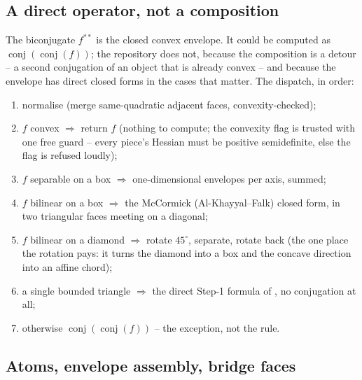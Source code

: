 \documentclass[11pt]{article}
\theoremstyle{definition}
\begin{document}
\subsection{A direct operator, not a composition}

The biconjugate $f^{**}$ is the closed convex envelope. It could be computed as
$\operatorname{conj}(\operatorname{conj}(f))$; the repository does not, because
the composition is a detour -- a second conjugation of an object that is
already convex -- and because the envelope has direct closed forms in the cases
that matter. The dispatch, in order:
\begin{enumerate}[leftmargin=*]
\item normalise (merge same-quadratic adjacent faces, convexity-checked);
\item $f$ convex $\Rightarrow$ return $f$ (nothing to compute; the convexity
  flag is trusted with one free guard -- every piece's Hessian must be positive
  semidefinite, else the flag is refused loudly);
\item $f$ separable on a box $\Rightarrow$ one-dimensional envelopes per axis,
  summed;
\item $f$ bilinear on a box $\Rightarrow$ the McCormick (Al-Khayyal--Falk)
  closed form, in two triangular faces meeting on a diagonal;
\item $f$ bilinear on a diamond $\Rightarrow$ rotate $45^\circ$, separate,
  rotate back (the one place the rotation pays: it turns the diamond into a box
  and the concave direction into an affine chord);
\item a single bounded triangle $\Rightarrow$ the direct Step-1 formula of
  \citet{KARMARKAR-25a}, no conjugation at all;
\item otherwise $\operatorname{conj}(\operatorname{conj}(f))$ -- the exception,
  not the rule.
\end{enumerate}

\subsection{Atoms, envelope assembly, bridge faces}
\end{document}
